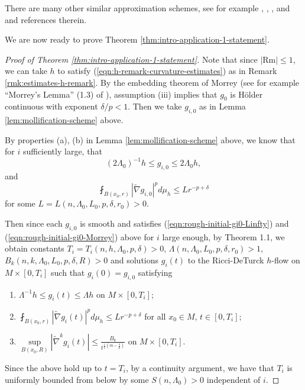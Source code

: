 \documentclass[12pt]{amsart}
\theoremstyle{plain}
\theoremstyle{plain}
\theoremstyle{definition}
\theoremstyle{remark}
\numberwithin{equation}{subsection}
\newcommand{\hdel}{\tilde{\nabla}}
\begin{document}
There are many other similar approximation schemes, see for example \cite{lee_positive_2013}, \cite{shi_scalar_2016}, \cite{lee_continuous_2021}, and \cite{grant_positive_2014} and references therein.

We are now ready to prove Theorem \ref{thm:intro-application-1-statement}.

\begin{proof}[Proof of Theorem \ref{thm:intro-application-1-statement}]
    Note that since $|\text{Rm}|\leq 1$, we can take $h$ to satisfy (\ref{eqn:h-remark-curvature-estimates}) as in Remark \ref{rmk:estimates-h-remark}. By the embedding theorem of Morrey (see for example ``Morrey's Lemma'' (1.3) of \cite{adams_morrey_2015}), assumption (iii) implies that $g_0$ is H\"older continuous with exponent $\delta/p < 1$. Then we take $g_{i,0}$ as in Lemma \ref{lem:mollification-scheme} above.

    By properties (a), (b) in Lemma \ref{lem:mollification-scheme} above, we know that for $i$ sufficiently large, that
    \begin{equation}\label{eqn:rough-initial-gi0-Linfty}
        (2\Lambda_0)^{-1}h \leq g_{i,0} \leq 2\Lambda_0 h,
    \end{equation}
    and
    \begin{equation}\label{eqn:rough-initial-gi0-Morrey}
        \fint_{B(x_0, r)} |\hdel g_{i,0}|^p d\mu_h \leq L r^{-p+\delta}
    \end{equation}
    for some $L = L(n, \Lambda_0, L_0, p, \delta, r_0) > 0$.

    Then since each $g_{i,0}$ is smooth and satisfies (\ref{eqn:rough-initial-gi0-Linfty}) and (\ref{eqn:rough-initial-gi0-Morrey}) above for $i$ large enough, by Theorem 1.1, we obtain constants $T_i = T_i(n,h,\Lambda_0,p,\delta) > 0$, $\Lambda(n, \Lambda_0, L_0, p, \delta, r_0) > 1$, $B_k(n, k, \Lambda_0, L_0, p, \delta, R) > 0$ and solutions $g_i(t)$ to the Ricci-DeTurck $h$-flow on $M \times [0,T_i]$ such that $g_i(0) = g_{i,0}$ satisfying
    \begin{enumerate}[(i')]
        \item $\Lambda^{-1}h \leq g_i(t) \leq \Lambda h$ on $M \times [0,T_i]$;
        \item $\fint_{B(x_0,r)} |\hdel g_i(t)|^p d\mu_h \leq Lr^{-p+\delta}$ for all $x_0 \in M$, $t \in [0,T_i]$;
        \item $\sup\limits_{B(x_0, R)}|\hdel^k g_i(t)| \leq \frac{B_k}{t^{\frac{1}{2}(m-\frac{\delta}{p})}}$ on $M \times [0,T_i]$.
    \end{enumerate}
    Since the above hold up to $t = T_i$, by a continuity argument, we have that $T_i$ is uniformly bounded from below by some $S(n,\Lambda_0) > 0$ independent of $i$.


\end{proof}
\end{document}
